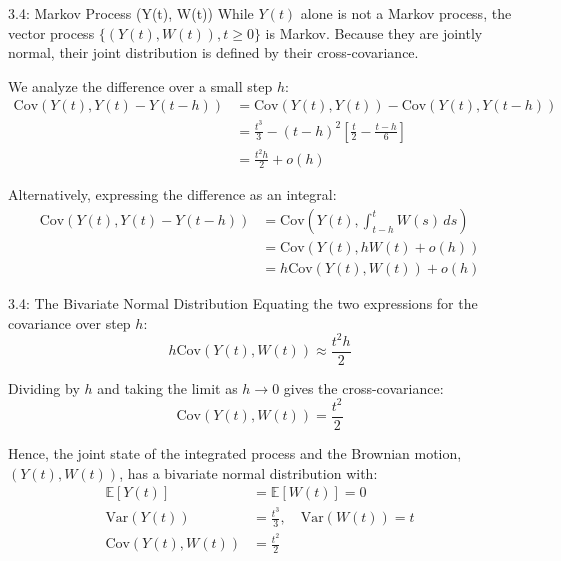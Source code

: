 \documentclass{beamer}
\begin{document}
	\begin{frame}{3.4: Markov Process (Y(t), W(t))}
		While $Y(t)$ alone is not a Markov process, the vector process $\{(Y(t), W(t)), t \ge 0\}$ is Markov. Because they are jointly normal, their joint distribution is defined by their cross-covariance.
		
		\vspace{0.2cm}
		We analyze the difference over a small step $h$:
		\begin{align*}
			\text{Cov}(Y(t), Y(t) - Y(t-h)) &= \text{Cov}(Y(t), Y(t)) - \text{Cov}(Y(t), Y(t-h)) \\
			&= \frac{t^3}{3} - (t-h)^2 \left[ \frac{t}{2} - \frac{t-h}{6} \right] \\
			&= \frac{t^2h}{2} + o(h)
		\end{align*}
		
		\vspace{0.2cm}
		Alternatively, expressing the difference as an integral:
		\begin{align*}
			\text{Cov}(Y(t), Y(t) - Y(t-h)) &= \text{Cov}\left(Y(t), \int_{t-h}^t W(s) \, ds\right) \\
			&= \text{Cov}(Y(t), hW(t) + o(h)) \\
			&= h\text{Cov}(Y(t), W(t)) + o(h)
		\end{align*}
	\end{frame}
	
	\begin{frame}{3.4: The Bivariate Normal Distribution}
		Equating the two expressions for the covariance over step $h$:
		$$h\text{Cov}(Y(t), W(t)) \approx \frac{t^2h}{2}$$
		
		\vspace{0.3cm}
		Dividing by $h$ and taking the limit as $h \to 0$ gives the cross-covariance:
		$$\text{Cov}(Y(t), W(t)) = \frac{t^2}{2}$$
		
		\vspace{0.3cm}
		Hence, the joint state of the integrated process and the Brownian motion, $(Y(t), W(t))$, has a bivariate normal distribution with:
		\begin{align*}
			\mathbb{E}[Y(t)] &= \mathbb{E}[W(t)] = 0 \\
			\text{Var}(Y(t)) &= \frac{t^3}{3}, \quad \text{Var}(W(t)) = t \\
			\text{Cov}(Y(t), W(t)) &= \frac{t^2}{2}
		\end{align*}
	\end{frame}
	
\end{document}
